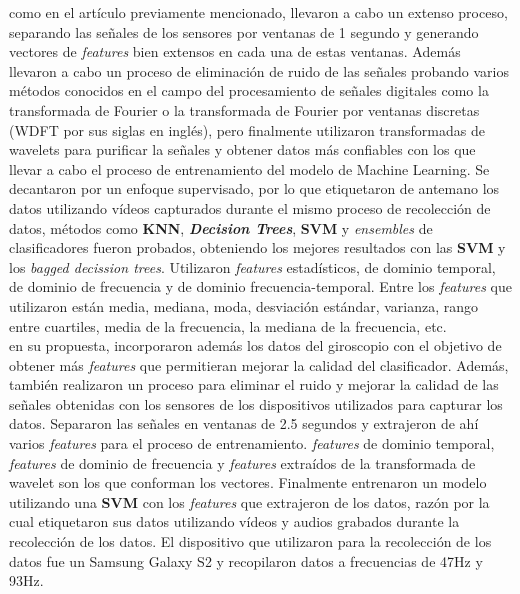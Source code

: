 \cite{el2018towards} como en el artículo previamente mencionado, llevaron a cabo un extenso proceso, separando las señales de los sensores por
ventanas de 1 segundo y generando vectores de \emph{features} bien extensos en cada una de estas ventanas. Además llevaron a cabo un proceso de eliminación de ruido
de las señales probando varios métodos conocidos en el campo del procesamiento de señales digitales como la transformada de Fourier o la transformada de
Fourier por ventanas discretas (WDFT por sus siglas en inglés), pero finalmente utilizaron transformadas de wavelets para purificar la señales y obtener
datos más confiables con los que llevar a cabo el proceso de entrenamiento del modelo de Machine Learning. Se decantaron por un enfoque supervisado, por lo que 
etiquetaron de antemano los datos utilizando vídeos capturados durante el mismo proceso de recolección de datos, métodos como \textbf{KNN},
\emph{\textbf{Decision Trees}}, \textbf{SVM} y \emph{ensembles} de clasificadores fueron probados, obteniendo los mejores resultados con las \textbf{SVM} y los
\emph{bagged decission trees}. Utilizaron \emph{features} estadísticos, de dominio temporal, de dominio de frecuencia y de dominio frecuencia-temporal. Entre los \emph{features}
que utilizaron están media, mediana, moda, desviación estándar, varianza, rango entre cuartiles, media de la frecuencia, la mediana de la frecuencia, etc.\\

\cite{seraj2015roads} en su propuesta, incorporaron además los datos del giroscopio con el objetivo de obtener más \emph{features} que permitieran mejorar la calidad
del clasificador. Además, también realizaron un proceso para eliminar el ruido y mejorar la calidad de las señales obtenidas con los sensores de los dispositivos
utilizados para capturar los datos. Separaron las señales en ventanas de 2.5 segundos y extrajeron de ahí varios \emph{features} para el proceso de entrenamiento. \emph{features}
de dominio temporal, \emph{features} de dominio de frecuencia y \emph{features} extraídos de la transformada de wavelet son los que conforman los vectores. Finalmente entrenaron
un modelo utilizando una \textbf{SVM} con los \emph{features} que extrajeron de los datos, razón por la cual etiquetaron sus datos utilizando vídeos y audios grabados durante la
recolección de los datos. El dispositivo que utilizaron para la recolección de los datos fue un Samsung Galaxy S2 y recopilaron datos a frecuencias de 47Hz y 93Hz.\\


